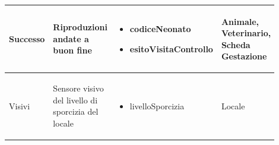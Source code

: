 \documentclass[12pt,a4paper]{article}
\begin{document}
\begin{center}
\begin{longtable}{|p{0.14\linewidth}|p{0.20\linewidth}|p{0.36\linewidth}|p{0.20\linewidth}|}
\hline
Successo				& \begin{flushleft}\vspace{-25pt} Riproduzioni andate a buon fine \end{flushleft}
					& \begin{itemize}
						\setlength{\itemindent}{-1em}
						\vspace{-25pt}
						\setlength\itemsep{-0.25em}
						\item codiceNeonato
						\item esitoVisitaControllo
					\end{itemize}
					& \begin{flushleft}\vspace{-25pt} Animale, Veterinario, Scheda Gestazione \end{flushleft}\\

\hline
Visivi 				& \begin{flushleft}\vspace{-25pt} Sensore visivo del livello di sporcizia del locale \end{flushleft} 
					& \begin{itemize}
						\setlength{\itemindent}{-1em}
						\vspace{-25pt}
						\setlength\itemsep{-0.25em}
						\item livelloSporcizia
					\end{itemize}
					& \begin{flushleft}\vspace{-25pt} Locale \end{flushleft}\\

\hline

\end{longtable}
\end{center}
\pagebreak
\end{document}
